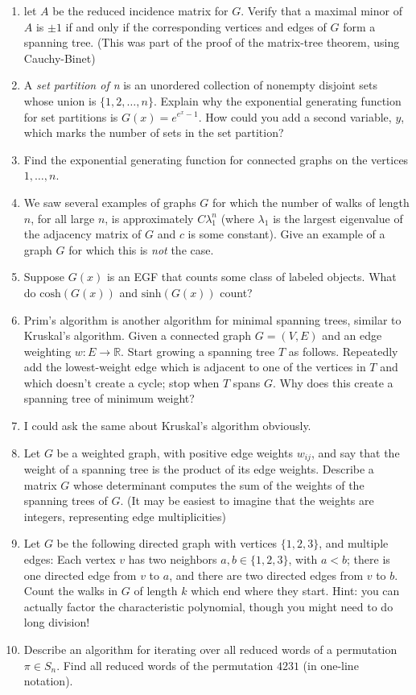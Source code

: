 \documentclass[12pt]{article}
\begin{document}
\begin{enumerate}
	\item let $A$ be the reduced incidence matrix for $G$. Verify that a maximal minor of $A$  is $\pm 1$ if and only if the corresponding vertices and edges of $G$ form a spanning tree.  (This was part of the proof of the matrix-tree theorem, using Cauchy-Binet)
	\item A \emph{set partition of n} is an unordered collection of nonempty disjoint sets whose union is $\{1,2, \dots, n\}$.  Explain why the exponential generating function for set partitions is $G(x) = e^{e^x-1}$.  How could you add a second variable, $y$, which marks the number of sets in the set partition?
	\item Find the exponential generating function for connected graphs on the vertices $1, \dots, n$.
	\item We saw several examples of graphs $G$ for which the number of walks of length $n$, for all large $n$, is approximately $C\lambda_1^n$ (where $\lambda_1$ is the largest eigenvalue of the adjacency matrix of $G$ and $c$ is some constant).  Give an example of a graph $G$ for which this is \emph{not} the case.
	\item Suppose $G(x)$ is an EGF that counts some class of labeled objects.  What do $\text{cosh} (G(x))$ and $\text{sinh}(G(x))$ count?
	\item Prim's algorithm is another algorithm for minimal spanning trees, similar to Kruskal's algorithm.  Given a connected graph $G = (V,E)$ and an edge weighting $w:E \rightarrow \mathbb{R}$.  Start growing a spanning tree $T$ as follows.  Repeatedly add the lowest-weight edge which is adjacent to one of the vertices in $T$ and which doesn't create a cycle; stop when $T$ spans $G$. Why does this create a spanning tree of minimum weight?
	\item I could ask the same about Kruskal's algorithm obviously.
	\item Let $G$ be a weighted graph, with positive edge weights $w_{ij}$, and say that the weight of a spanning tree is the product of its edge weights.  Describe a matrix $G$ whose determinant computes the sum of the weights of the spanning trees of $G$.  (It may be easiest to imagine that the weights are integers, representing edge multiplicities)
	\item Let $G$ be the following directed graph with vertices $\{1,2,3\}$, and multiple edges:  Each vertex $v$ has two neighbors $a, b \in \{1,2,3\}$, with $a < b$; there is one directed edge from $v$ to $a$, and there are two directed edges from $v$ to $b$.  Count the walks in $G$ of length $k$ which end where they start.  Hint: you can actually factor the characteristic polynomial, though you might need to do long division!
	\item Describe an algorithm for iterating over all reduced words of a permutation $\pi \in S_n$.  Find all reduced words of the permutation $4231$ (in one-line notation).
\end{enumerate}
\end{document}
